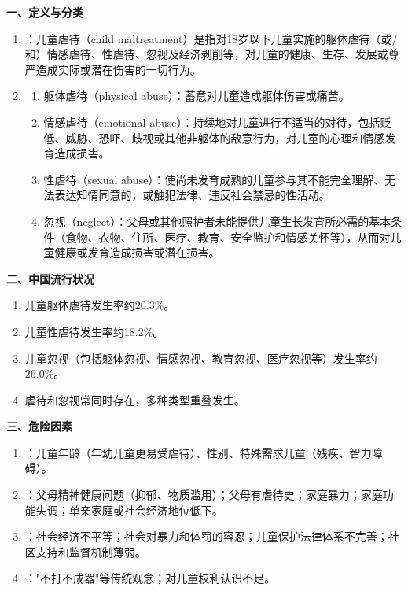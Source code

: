 \begin{keybox}
\textbf{一、定义与分类}
\begin{enumerate}[leftmargin=*]
    \item {}：儿童虐待（child maltreatment）是指对18岁以下儿童实施的躯体虐待（或/和）情感虐待、性虐待、忽视及经济剥削等，对儿童的健康、生存、发展或尊严造成实际或潜在伤害的一切行为。

    \item {}
    \begin{enumerate}
        \item 躯体虐待（physical abuse）：蓄意对儿童造成躯体伤害或痛苦。
        \item 情感虐待（emotional abuse）：持续地对儿童进行不适当的对待，包括贬低、威胁、恐吓、歧视或其他非躯体的敌意行为，对儿童的心理和情感发育造成损害。
        \item 性虐待（sexual abuse）：使尚未发育成熟的儿童参与其不能完全理解、无法表达知情同意的，或触犯法律、违反社会禁忌的性活动。
        \item 忽视（neglect）：父母或其他照护者未能提供儿童生长发育所必需的基本条件（食物、衣物、住所、医疗、教育、安全监护和情感关怀等），从而对儿童健康或发育造成损害或潜在损害。
    \end{enumerate}
\end{enumerate}

\textbf{二、中国流行状况}
\begin{enumerate}[leftmargin=*]
    \item 儿童躯体虐待发生率约20.3\%。
    \item 儿童性虐待发生率约18.2\%。
    \item 儿童忽视（包括躯体忽视、情感忽视、教育忽视、医疗忽视等）发生率约26.0\%。
    \item 虐待和忽视常同时存在，多种类型重叠发生。
\end{enumerate}

\textbf{三、危险因素}
\begin{enumerate}[leftmargin=*]
    \item {}：儿童年龄（年幼儿童更易受虐待）、性别、特殊需求儿童（残疾、智力障碍）。
    \item {}：父母精神健康问题（抑郁、物质滥用）；父母有虐待史；家庭暴力；家庭功能失调；单亲家庭或社会经济地位低下。
    \item {}：社会经济不平等；社会对暴力和体罚的容忍；儿童保护法律体系不完善；社区支持和监督机制薄弱。
    \item {}："不打不成器"等传统观念；对儿童权利认识不足。
\end{enumerate}


\end{keybox}
